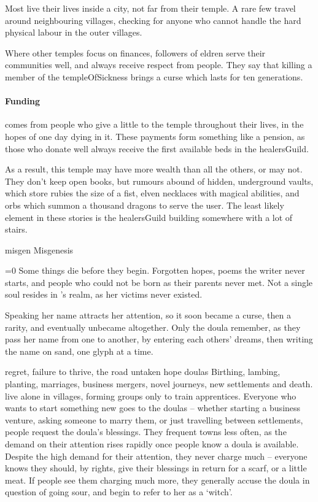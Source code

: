 \begin{multicols}{2}
Most live their lives inside a city, not far from their temple.
A rare few travel around neighbouring \glspl{village}, checking for anyone who cannot handle the hard physical labour in the outer \glspl{village}.

Where other temples focus on finances, followers of \gls{eldren} serve their communities well, and always receive respect from people.
They say that killing a member of the \gls{templeOfSickness} brings a curse which lasts for ten generations.

\paragraph{Funding}
comes from people who give a little to the temple throughout their lives, in the hopes of one day dying in it.
These payments form something like a pension, as those who donate well always receive the first available beds in the \gls{healersGuild}.

As a result, this temple may have more wealth than all the others, or may not.
They don't keep open books, but rumours abound of hidden, underground vaults, which store rubies the size of a fist, elven necklaces with magical abilities, and orbs which summon a thousand dragons to serve the user.
The least likely element in these stories is the \gls{healersGuild} building somewhere with a lot of stairs.

\guild{\hphantom{Nulla}}%
  {\gls{misgen}}%
  {Misgenesis}%
  {
  \ifnum\value{temperature}=0\fi
  Some things die before they begin.
  Forgotten hopes, poems the writer never starts, and people who could not be born as their parents never met.
  Not a single soul resides in \hphantom{Nulla}'s realm, as her victims never existed.

  Speaking her name attracts her attention, so it soon became a curse, then a rarity, and eventually unbecame altogether.
  Only the doula remember, as they pass her name from one to another, by entering each others' dreams, then writing the name on sand, one glyph at a time.
  }%
  {regret, failure to thrive, the road untaken}%
  {hope}%
  {\Glspl{doula}}%
  {
    Birthing, lambing, planting, marriages, business mergers, novel journeys, new settlements and death.
  }%
live alone in \glspl{village}, forming groups only to train apprentices.
Everyone who wants to start something new goes to the \glspl{doula} -- whether starting a business venture, asking someone to marry them, or just travelling between settlements, people request the doula's blessings.
They frequent towns less often, as the demand on their attention rises rapidly once people know a doula is available.
Despite the high demand for their attention, they never charge much -- everyone knows they should, by rights, give their blessings in return for a scarf, or a little meat.
If people see them charging much more, they generally accuse the doula in question of going sour, and begin to refer to her as a `witch'.


\end{multicols}
